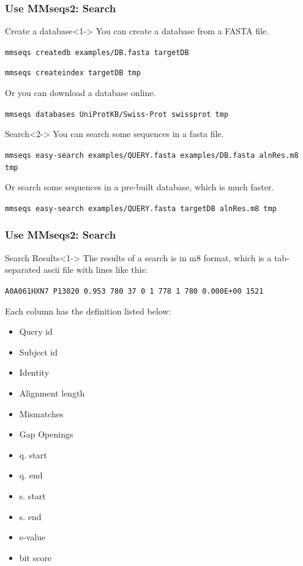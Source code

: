 \documentclass[UTF8]{beamer}
\begin{document}
	\begin{frame}[fragile]
	    \frametitle{Use MMseqs2: Search}
		\begin{block}{Create a database}<1->
			You can create a database from a FASTA file.

			\lstinline{mmseqs createdb examples/DB.fasta targetDB}

			\lstinline{mmseqs createindex targetDB tmp}

			Or you can download a database online.

			\lstinline{mmseqs databases UniProtKB/Swiss-Prot swissprot tmp}
		\end{block}

		\begin{block}{Search}<2->
			You can search some sequences in a fasta file.

			\lstinline{mmseqs easy-search examples/QUERY.fasta examples/DB.fasta alnRes.m8 tmp}

			Or search some sequences in a pre-built database, which is much faster.

			\lstinline{mmseqs easy-search examples/QUERY.fasta targetDB alnRes.m8 tmp}

		\end{block}

    \end{frame}

	\begin{frame}[fragile]
	    \frametitle{Use MMseqs2: Search}

		\begin{block}{Search Results}<1->
			The results of a search is in \alert{m8 format}, which is a tab-separated ascii file with lines like this:

			\lstinline{A0A061HXN7 P13020 0.953 780 37 0 1 778 1 780 0.000E+00 1521}

			Each column has the definition listed below:
			\begin{itemize}
				\tiny
				\item Query id
				\item Subject id
				\item Identity
				\item Alignment length
				\item Mismatches
				\item Gap Openings
				\item q. start
				\item q. end
				\item s. start
				\item s. end
				\item e-value
				\item bit score
			\end{itemize}
		\end{block}

    \end{frame}
\end{document}
